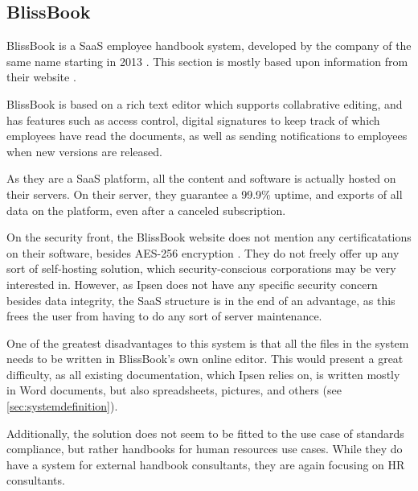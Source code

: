 \subsection{BlissBook}
BlissBook is a SaaS employee handbook system, developed by the company of the same name starting in 2013 \cite{BlissbookInfo}.
This section is mostly based upon information from their website \cite{BlissbookContents}.

BlissBook is based on a rich text editor which supports collabrative editing, and has features such as access control, digital signatures to keep track of which employees have read the documents, as well as sending notifications to employees when new versions are released.

As they are a SaaS platform, all the content and software is actually hosted on their servers.
On their server, they guarantee a 99.9\% uptime, and exports of all data on the platform, even after a canceled subscription.

On the security front, the BlissBook website does not mention any certificatations on their software, besides  AES-256 encryption \cite{BlissbookSecurity}.
They do not freely offer up any sort of self-hosting solution, which security-conscious corporations may be very interested in.
However, as Ipsen does not have any specific security concern besides data integrity, the SaaS structure is in the end of an advantage, as this frees the user from having to do any sort of server maintenance.

One of the greatest disadvantages to this system is that all the files in the system needs to be written in BlissBook's own online editor.
This would present a great difficulty, as all existing documentation, which Ipsen relies on, is written mostly in Word documents, but also spreadsheets, pictures, and others (see \cref{sec:systemdefinition}).

Additionally, the solution does not seem to be fitted to the use case of standards compliance, but rather handbooks for human resources use cases.
While they do have a system for external handbook consultants, they are again focusing on HR consultants. \cite{BlissbookHandbook}
